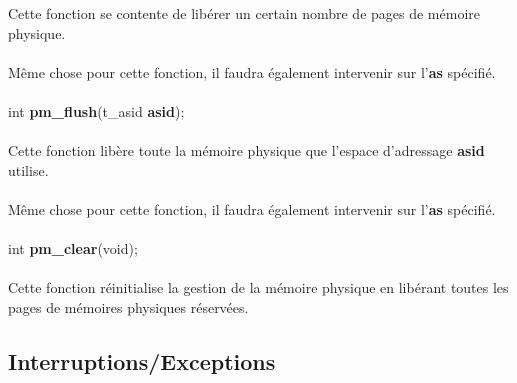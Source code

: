 \documentclass[10pt,a4wide]{article}
\begin{document}
Cette fonction se contente de lib\'erer un certain nombre
de pages de m\'emoire physique.

\paragraph{}

M\^eme chose pour cette fonction, il faudra \'egalement intervenir sur
l'\textbf{as} sp\'ecifi\'e.

\paragraph{}

\hspace{1.5cm}int \textbf{pm\_flush}(t\_asid \textbf{asid});

\paragraph{}

Cette fonction lib\`ere toute la m\'emoire physique que l'espace d'adressage
\textbf{asid} utilise.

\paragraph{}

M\^eme chose pour cette fonction, il faudra \'egalement intervenir sur
l'\textbf{as} sp\'ecifi\'e.

\paragraph{}

\hspace{1.5cm}int \textbf{pm\_clear}(void);

\paragraph{}

Cette fonction r\'einitialise la gestion de la m\'emoire physique en lib\'erant
toutes les pages de m\'emoires physiques r\'eserv\'ees.

\subsection{Interruptions/Exceptions}

\paragraph{}
\end{document}
